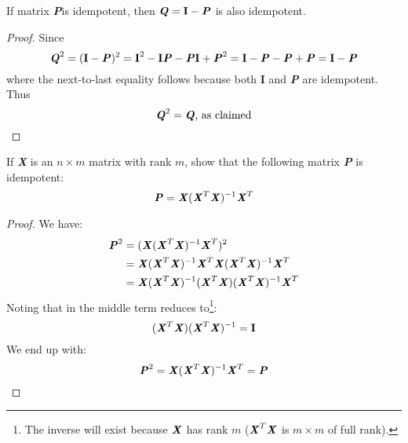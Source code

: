 \documentclass[12pt]{article}
\newcommand{\blditP}{\textbf{\textit{P}}}
\newcommand{\blditQ}{\textbf{\textit{Q}}}
\newcommand{\bldI}{\textbf{I}}
\newcommand{\blditX}{\textbf{\textit{X}}}
\newenvironment{question}[2][Question]{\begin{trivlist}
\item[\hskip \labelsep {\bfseries #1}\hskip \labelsep {\bfseries #2.}]}{\end{trivlist}}
\begin{document}
\bigskip
\bigskip

\begin{question}{1. 3. a} 
If matrix \blditP is idempotent, then $\blditQ = \bldI - \blditP$ is also idempotent.
\end{question}

\begin{proof}
Since
\begin{equation*}
\blditQ^2 = (\bldI - \blditP)^2 = \bldI^2 - \bldI \blditP - \blditP \bldI + \blditP^2 = \bldI - \blditP - \blditP + \blditP = \bldI - \blditP 
\end{equation*}
where the next-to-last equality follows because both \bldI $ $ and \blditP $ $ are idempotent. Thus
\begin{equation*}
\blditQ^2 = \blditQ \text{, as claimed}
\end{equation*}
\end{proof}



\bigskip
\begin{question}{1. 3. b} 
If \blditX $ $ is an $n \times m$ matrix with rank $m$, show that the following matrix \blditP $ $ is idempotent:
\begin{equation*}
\blditP = \blditX (\blditX^T \blditX)^{-1}\blditX^T
\end{equation*}

\end{question}

\begin{proof}
We have:
\begin{align*}
\blditP^2 &= (\blditX (\blditX^T \blditX)^{-1}\blditX^T)^2 \\
 & = \blditX (\blditX^T \blditX)^{-1}\blditX^T \blditX (\blditX^T \blditX)^{-1}\blditX^T \\
 & = \blditX (\blditX^T \blditX)^{-1}(\blditX^T \blditX) (\blditX^T \blditX)^{-1}\blditX^T 
\end{align*}
Noting that in the middle term reduces to\footnote{The inverse will exist because $\blditX$ has rank $m$ ($\blditX^T \blditX$ is $m \times m$ of full rank).}:
\begin{equation*}
(\blditX^T \blditX) (\blditX^T \blditX)^{-1} = \bldI
\end{equation*}
We end up with:
\begin{equation*}
\blditP^2 = \blditX (\blditX^T \blditX)^{-1}\blditX^T = \blditP
\end{equation*}
\end{proof}
\end{document}

